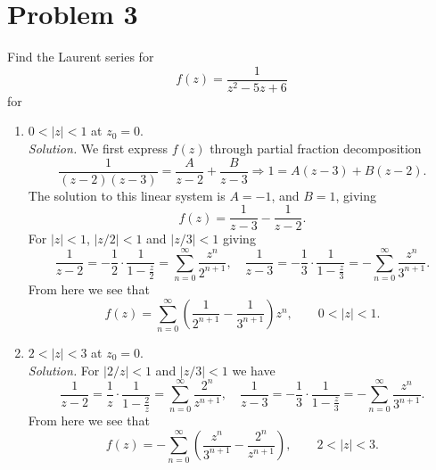 \documentclass[12pt]{article}
\begin{document}
\section*{Problem 3}
Find the Laurent series for
\[
    f(z)=\frac{1}{z^2-5z+6}
\]
for 
\begin{enumerate}[label=(\alph*)]
    \item $0<|z|<1$ at $z_0=0.$\\
    \textit{Solution.} We first express $f(z)$ through partial fraction decomposition
    \[
        \frac{1}{(z-2)(z-3)}=\frac{A}{z-2}+\frac{B}{z-3}\Rightarrow 1=A(z-3)+B(z-2).
    \]
    The solution to this linear system is $A=-1$, and $B=1$, giving
    \[
        f(z)=\frac{1}{z-3}-\frac{1}{z-2}.
    \]
    For $|z|<1$, $|z/2|<1$ and $|z/3|<1$ giving
    \[
        \frac{1}{z-2}=-\frac{1}{2}\cdot\frac{1}{1-\frac{z}{2}}=\sum_{n=0}^{\infty}\frac{z^n}{2^{n+1}},\quad \frac{1}{z-3}=-\frac{1}{3}\cdot\frac{1}{1-\frac{z}{3}}=-\sum_{n=0}^{\infty}\frac{z^n}{3^{n+1}}.
    \]
    From here we see that
    \[
        f(z)=\sum_{n=0}^{\infty}\left(\frac{1}{2^{n+1}}-\frac{1}{3^{n+1}}\right)z^n,\quad\quad 0<|z|<1.
    \]
    \item $2<|z|<3$ at $z_0=0.$\\
    \textit{Solution.} For $|2/z|<1$ and $|z/3|<1$ we have
    \[
        \frac{1}{z-2}=\frac{1}{z}\cdot\frac{1}{1-\frac{2}{z}}=\sum_{n=0}^{\infty}\frac{2^n}{z^{n+1}},\quad \frac{1}{z-3}=-\frac{1}{3}\cdot\frac{1}{1-\frac{z}{3}}=-\sum_{n=0}^{\infty}\frac{z^n}{3^{n+1}}.
    \]
    From here we see that
    \[
        f(z)=-\sum_{n=0}^{\infty}\left(\frac{z^n}{3^{n+1}}-\frac{2^n}{z^{n+1}}\right),\quad\quad 2<|z|<3.
    \]
\end{enumerate}


\end{document}

